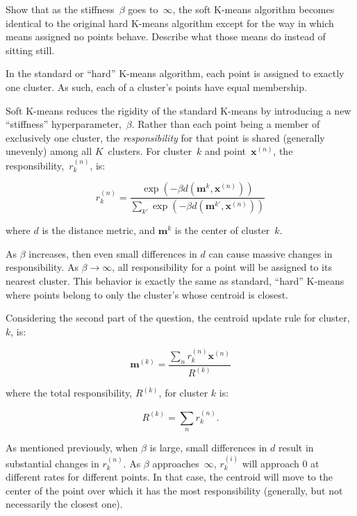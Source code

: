\newpage
\begin{problem}{20}{2}{2}
  Show that as the stiffness~$\beta$ goes to~$\infty$, the soft K-means algorithm becomes identical to the original hard K-means algorithm except for the way in which means assigned no points behave.  Describe what those means do instead of sitting still.
\end{problem}

In the standard or ``hard'' K-means algorithm, each point is assigned to exactly one cluster.  As such, each of a cluster's points have equal membership.

Soft K-means reduces the rigidity of the standard K-means by introducing a new ``stiffness'' hyperparameter,~$\beta$.  Rather than each point being a member of exclusively one cluster, the \textit{responsibility} for that point is shared (generally unevenly) among all $K$~clusters.  For cluster~$k$ and point~$\textbf{x}^{(n)}$, the responsibility,~$r_{k}^{(n)}$, is:

\[ r_{k}^{(n)} = \frac{\exp(-\beta d(\textbf{m}^{k}, \textbf{x}^{(n)}))}{\sum_{k'} \exp(-\beta d(\textbf{m}^{k'}, \textbf{x}^{(n)}))} \]

\noindent
where $d$ is the distance metric, and $\textbf{m}^{k}$ is the center of cluster~$k$.

As $\beta$ increases, then even small differences in $d$ can cause massive changes in responsibility.  As ${\beta \rightarrow \infty}$, all responsibility for a point will be assigned to its nearest cluster.  This behavior is exactly the same as standard, ``hard'' K-means where points belong to only the cluster's whose centroid is closest.

Considering the second part of the question, the centroid update rule for cluster,~$k$, is:

\[ \mathbf{m}^{(k)} = \frac{\sum_{n}r^{(n)}_k \mathbf{x}^{(n)}}{R^{(k)}} \]

\noindent
where the total responsibility, $R^{(k)}$, for cluster $k$ is:

\[ R^{(k)}=\sum_{n} r_{k}^{(n)} \text{.} \]

As mentioned previously, when $\beta$ is large, small differences in $d$ result in substantial changes in $r_{k}^{(n)}$. As $\beta$ approaches~$\infty$, $r_{k}^{(i)}$ will approach $0$ at different rates for different points.  In that case, the centroid will move to the center of the point over which it has the most responsibility (generally, but not necessarily the closest one).
